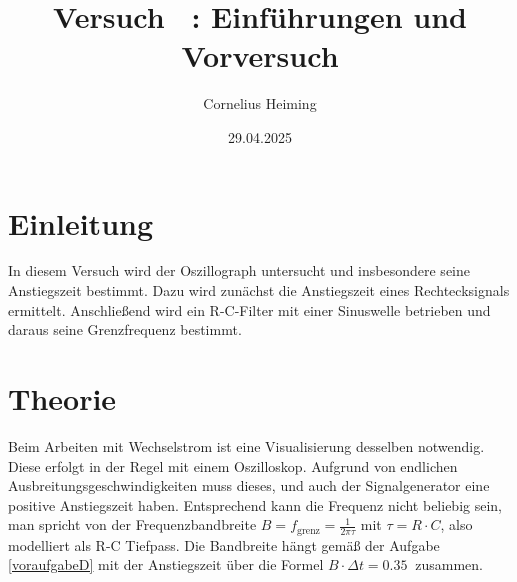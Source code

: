 \documentclass[ngerman]{scrartcl}
\author{Cornelius Heiming}
\title{Versuch \nummer~:  Einf\"uhrungen und Vorversuch}
\date{29.04.2025}
\theoremstyle{definition}
\begin{document}
	\maketitle
	\section{Einleitung}
		In diesem Versuch wird der Oszillograph untersucht und insbesondere seine Anstiegszeit bestimmt. Dazu wird zunächst die Anstiegszeit eines Rechtecksignals ermittelt. Anschließend wird ein R-C-Filter mit einer Sinuswelle betrieben und daraus seine Grenzfrequenz bestimmt. 
	\section{Theorie}

		Beim Arbeiten mit Wechselstrom ist eine Visualisierung desselben notwendig. Diese erfolgt in der Regel mit einem Oszilloskop. Aufgrund von endlichen Ausbreitungsgeschwindigkeiten muss dieses, und auch der Signalgenerator eine positive Anstiegszeit haben. Entsprechend kann die Frequenz nicht beliebig sein, man spricht von der Frequenzbandbreite $B = f_\mathrm{grenz} = \frac{1}{2\pi \tau}$ mit $\tau = R \cdot C$, also modelliert als R-C Tiefpass. Die Bandbreite hängt gemäß der Aufgabe \ref{voraufgabeD} mit der Anstiegszeit über die Formel $B \cdot \Delta t = \SI{0,35}{}$ zusammen.
\end{document}
